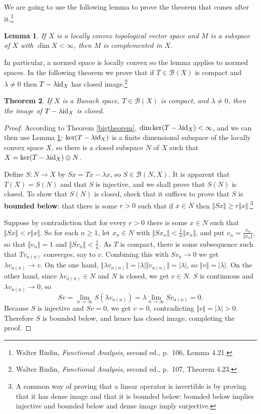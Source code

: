 \documentclass{article}
\newcommand{\id}{\ensuremath\mathrm{id}}
\newcommand{\norm}[1]{\Vert #1 \Vert}
\newtheorem{theorem}{Theorem}
\newtheorem{lemma}[theorem]{Lemma}
\begin{document}
We are going to use the following lemma to prove the theorem that comes after it.\footnote{Walter Rudin,
{\em Functional Analysis}, second ed., p.~106, Lemma 4.21.} 

\begin{lemma}
If $X$ is a locally convex topological vector space and $M$ is a  subspace of $X$ with
$\dim X < \infty$, then $M$ is complemented in $X$.
\label{complementlemma}
\end{lemma}

In particular, a normed space is locally convex so the lemma applies to normed spaces. In the following theorem we prove
that 
if $T \in \mathscr{B}(X)$ is compact and $\lambda \neq 0$ then $T-\lambda \id_X$ has closed image.\footnote{Walter Rudin, {\em Functional Analysis}, second ed., p.~107, Theorem 4.23.}

\begin{theorem}
If $X$ is a Banach space, $T \in \mathscr{B}(X)$ is compact, and $\lambda \neq 0$, then the image of 
$T-\lambda \id_X$ is closed.
\label{closedimage}
\end{theorem}
\begin{proof}
According to Theorem \ref{bigtheorem}, $\dim \ker(T-\lambda \id_X)< \infty$, and we can then  use
Lemma \ref{complementlemma}: $\ker(T-\lambda \id_X)$ is a finite dimensional subspace of the locally convex space
$X$, so there is a closed subspace $N$ of $X$ such that $X = \ker(T-\lambda \id_X) \oplus N$.

Define $S:N \to X$ by $Sx = Tx-\lambda x$, so $S \in \mathscr{B}(N,X)$.
It is apparent that $T(X)=S(N)$ and that $S$ is injective, and we shall prove that $S(N)$ is closed.
To show that $S(N)$ is closed, check that it suffices to prove that $S$ is \textbf{bounded below}: that there is some $r>0$
such that if $x \in N$ then $\norm{Sx} \geq r\norm{x}$.\footnote{A common way of proving that a linear operator is invertible is by
proving that it has dense image and that it is bounded below: bounded below implies injective and bounded below
and dense image imply surjective.} 
 
Suppose by contradiction that for every $r>0$ there is some $x \in N$ such that $\norm{Sx}<r\norm{x}$. 
So for each $n \geq 1$, let $x_n \in N$ with $\norm{Sx_n}< \frac{1}{n} \norm{x_n}$, and put
$v_n = \frac{x_n}{\norm{x_n}}$, so that $\norm{v_n}=1$ and $\norm{Sv_n}<\frac{1}{n}$.
As $T$ is compact, there is some subsequence such that $Tv_{a(n)}$ converges, say to $v$.
Combining this with $Sv_n \to 0$ we get $\lambda v_{a(n)} \to v$.
On the one hand, $\norm{\lambda v_{a(n)}} = |\lambda| \norm{v_{a(n)}} = |\lambda|$, so $\norm{v} = |\lambda|$.
On the other hand,
since $\lambda v_{a(n)} \in N$ and $N$ is closed,
we get $v \in N$. $S$ is continuous and $\lambda v_{a(n)} \to 0$, so
\[
Sv = \lim_{n \to \infty} S(\lambda v_{a(n)}) = \lambda \lim_{n \to \infty} Sv_{a(n)} = 0.
\]
Because $S$ is injective and $Sv=0$, we get $v=0$, contradicting $\norm{v}=|\lambda|>0$. Therefore $S$
is bounded below, and hence has closed image, completing the proof.
\end{proof}
\end{document}
